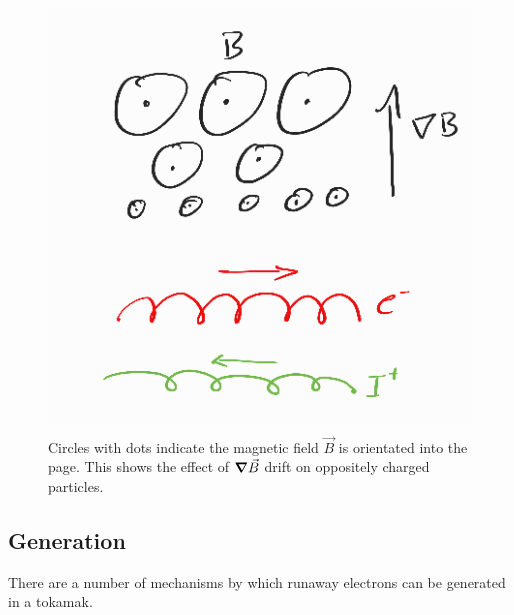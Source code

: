 \begin{figure}[h!]
    \centering
    \includegraphics[scale=2.1]{imgs/c2/gradb-drift.png}
    \caption{Circles with dots indicate the magnetic field $\vec{B}$ is orientated into the page. This shows the effect of 
    $\grad \vec{B}$ drift on oppositely charged particles.}
\end{figure}\newpage

\subsection{Generation}

There are a number of mechanisms by which runaway electrons can be generated in a tokamak.

